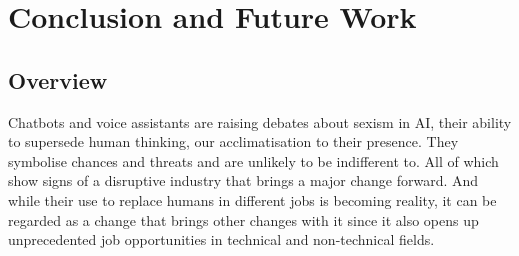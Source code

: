 \chapter{Conclusion and Future Work}
\label{conclusion}
\section{Overview} %



Chatbots and voice assistants are raising debates about sexism in AI, their ability to supersede human thinking, our acclimatisation to their presence. They symbolise chances and threats and are unlikely to be indifferent to. All of which show signs of a disruptive industry that brings a major change forward. And while their use to replace humans in different jobs is becoming reality, it can be regarded as a change that brings other changes with it since it also opens up unprecedented job opportunities in technical and non-technical fields. %









